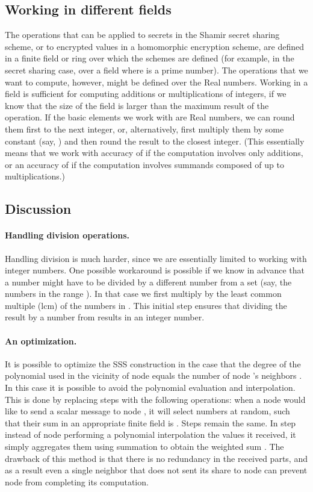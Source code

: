 \documentclass[10pt]{svjour3}
\begin{document}
\subsection{Working in different fields}
The operations that can be applied to secrets in the Shamir secret
sharing scheme, or to encrypted values in a homomorphic encryption
scheme, are defined in a finite field or ring over which the schemes
are defined (for example, in the secret sharing case, over a field
 where  is a prime number). The operations that we want to
compute, however, might be defined over the Real numbers.  Working
in a field is sufficient for computing additions or
multiplications of integers, if we know that the size of the field
is larger than the maximum result of the operation. If the basic
elements we work with are Real numbers, we can round them first to
the next integer, or, alternatively, first multiply them by some
constant  (say, ) and then round the result to the
closest integer. (This essentially means that we work with
accuracy of  if the computation involves only additions, or
an accuracy of  if the computation involves summands
composed of up to  multiplications.)

\subsection{Discussion}
\paragraph{Handling division operations.}
Handling division is much harder, since  we are essentially limited
to working with integer numbers. One possible workaround is
possible if we know in advance that a number  might have to be
divided by a different number from a set  (say, the numbers in
the range ). In that case we first multiply  by the
least common multiple (lcm) of the numbers in . This initial
step ensures that dividing the result by a number from  results
in an integer number.

\paragraph{An optimization.}
It is possible to optimize the SSS construction in the case that
the degree of the polynomial used in the vicinity of node 
equals the number of node 's neighbors . In
this case it is possible to avoid the polynomial evaluation and
interpolation. This is done by replacing steps  with the
following operations: when a node  would like to send a scalar
message  to node , it will select  numbers at
random, such that their sum in an appropriate finite field is
. Steps  remain the same. In step  instead
of node  performing a polynomial interpolation the values it
received, it simply aggregates them using summation to obtain the
weighted sum . The drawback of
this method is that there is no redundancy in the received parts,
and as a result even a single neighbor that does not sent its
share to node  can prevent node  from completing its
computation.
\end{document}
